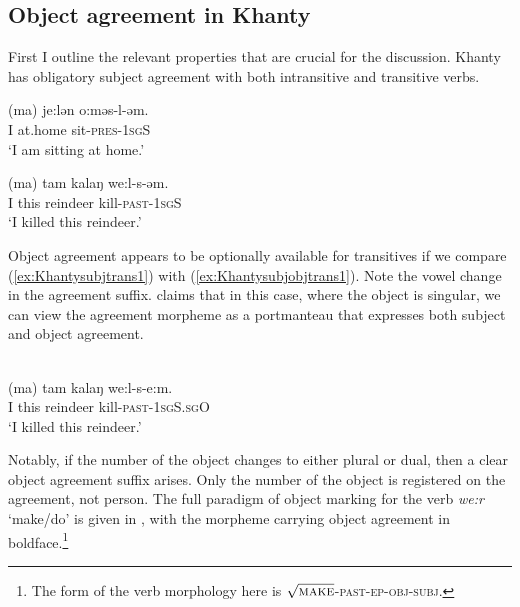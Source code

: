 \documentclass[output=paper
,modfonts
,nonflat]{langsci/langscibook}
\begin{document}
\subsection{Object agreement in Khanty}\label{khantyprop}

First I outline the relevant properties that are crucial for the discussion.
Khanty has obligatory subject agreement with both intransitive and transitive verbs. 

\begin{exe}
\ex \citet[][142]{dn2011}
\begin{xlist}
\ex
{\gll (ma) je:lən o:məs-l-əm.\\
I at.home sit-\textsc{pres}-\textsc{1sgS}\\
\glt `I am sitting at home.'} \label{ex:ostsubjintrans1}

\ex
{\gll (ma) tam kalaŋ we:l-s-əm.\\
I this reindeer kill-\textsc{past-1sgS}\\
\glt `I killed this reindeer.'} \label{ex:Khantysubjtrans1}
\end{xlist}
\end{exe}

\noindent Object agreement appears to be optionally available for transitives if we compare (\ref{ex:Khantysubjtrans1}) with (\ref{ex:Khantysubjobjtrans1}). Note the vowel change in the agreement suffix. \citet{nikolaeva1999} claims that in this case, where the object is singular, we can view the agreement morpheme as a portmanteau that expresses both subject and object agreement. 

\begin{exe}
  \ex \citet[][142]{dn2011}\\
{\gll (ma) tam kalaŋ we:l-s-e:m.\\
I this reindeer kill-\textsc{past-1sgS.sgO}\\
\glt `I killed this reindeer.'} \label{ex:Khantysubjobjtrans1}
\end{exe}

\noindent Notably, if the number of the object changes to either plural or dual, then a clear object agreement suffix arises.
Only the number of the object is registered on the agreement, not person.
The full paradigm of object marking for the verb \textit{we:r} `make/do' is given in , with the morpheme carrying object agreement in boldface.\footnote{The form of the verb morphology here is $\sqrt{\textsc{make}}$-\textsc{past}-\textsc{ep}-\textsc{obj}-\textsc{subj}.}
\end{document}
